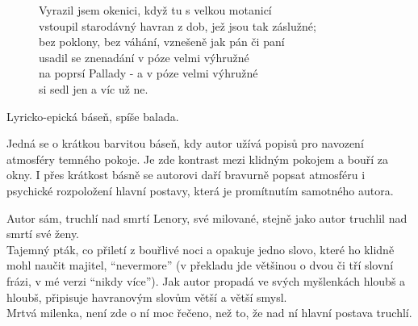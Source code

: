 \documentclass[FGBook.tex]{subfiles}
\begin{document}

\noindent\begin{figure}\footnotesize
{}
\setlength{\parindent}{3pt}
\begin{center}
\noindent
Vyrazil jsem okenici, když tu s velkou motanicí \\
vstoupil starodávný havran z dob, jež jsou tak záslužné; \\
bez poklony, bez váhání, vznešeně jak pán či paní \\
usadil se znenadání v póze velmi výhružné \\
na poprsí Pallady - a v póze velmi výhružné \\
si sedl jen a víc už ne. 
\end{center}
\end{figure}


\noindent 
Lyricko-epická báseň, spíše balada.





\noindent 
Jedná se o krátkou barvitou báseň, kdy autor užívá popisů pro navození atmosféry temného pokoje.
Je zde kontrast mezi klidným pokojem a bouří za okny.
I přes krátkost básně se autorovi daří bravurně popsat atmosféru i psychické rozpoložení hlavní postavy,
která je promítnutím samotného autora.

\noindent
{} Autor sám, truchlí nad smrtí Lenory, své milované,
stejně jako autor truchlil nad smrtí své ženy.\\
 Tajemný pták, co přiletí z bouřlivé noci a opakuje jedno slovo,
které ho klidně mohl naučit majitel, \enquote{nevermore}
(v překladu jde většinou o dvou či tří slovní frázi, v mé verzi \enquote{nikdy více}).
Jak autor propadá ve svých myšlenkách hloubš a hloubš, připisuje havranovým slovům větší a větší smysl.\\
 Mrtvá milenka, není zde o ní moc řečeno, než to, že nad ní hlavní postava truchlí.
\end{document}
